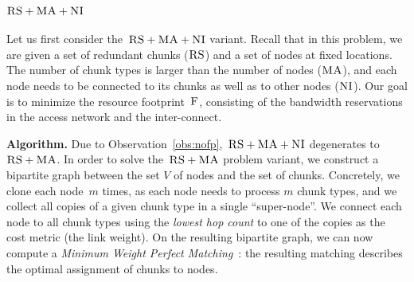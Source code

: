 \documentclass[preprint,12pt]{elsarticle}
\newcommand{\MaFactor}{m}
\newcommand{\ChunkType}{\tau}
\newcommand{\VirtualNodes}{\ensuremath{V}}
\newcommand{\CC}{\textsc{NI}}
\newcommand{\RS}{\textsc{RS}}
\newcommand{\MA}{\textsc{MA}}
\newcommand{\Cost}{\textsc{F}}
\begin{document}
\subsubsection{$\RS+\MA+\CC$}

Let us first consider the~$\RS+\MA+\CC$ variant.
Recall that in this problem,
we are given a set of redundant chunks ($\RS$) and a set of nodes
at fixed locations. The number of chunk types is larger than the number
of nodes ($\MA$), and each node needs to be connected
to its chunks as well as to other nodes ($\CC$).
Our goal is to minimize the resource footprint~$\Cost$, consisting
of the bandwidth reservations in the access network and the inter-connect.

\textbf{Algorithm.} Due to Observation~\ref{obs:nofp},~$\RS+\MA+\CC$ degenerates to~$\RS+\MA$.
In order to solve the~$\RS+\MA$ problem variant,
we construct a bipartite
graph between the set
$\VirtualNodes$ of nodes and
the set of chunks.
Concretely, we clone each node~$\MaFactor$ times,
as each node needs to process
$\MaFactor$ chunk types, and we collect all copies of a given chunk type in a
single %
``super-node''. We connect each node to all chunk types using the
\emph{lowest hop count} to one of the copies as the cost metric (the link weight).
On the resulting bipartite graph, we can now compute a \emph{Minimum Weight
Perfect
Matching}~\cite{gabow_scaling_algorithm}:
the resulting matching describes the optimal assignment of chunks to nodes.

\end{document}
